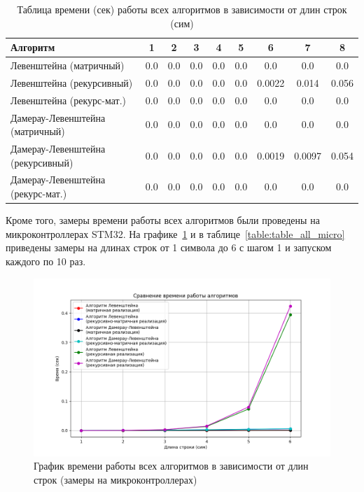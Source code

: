 \begin{table}[H]
    \centering
    \begin{tabular}{|l|c|c|c|c|c|c|c|c|}
        \hline
        \textbf{Алгоритм} & \textbf{1} & \textbf{2} & \textbf{3} & \textbf{4} & \textbf{5} & \textbf{6} & \textbf{7} & \textbf{8}\\
        \hline
        Левенштейна (матричный) & 0.0 & 0.0 & 0.0 & 0.0 & 0.0 & 0.0 & 0.0& 0.0 \\
        Левенштейна (рекурсивный) & 0.0 & 0.0 & 0.0 & 0.0 & 0.0 & 0.0022 & 0.014 & 0.056 \\
        Левенштейна (рекурс-мат.) & 0.0 & 0.0 & 0.0 & 0.0 & 0.0 & 0.0 & 0.0 & 0.0 \\
        Дамерау-Левенштейна (матричный) & 0.0 & 0.0 & 0.0 & 0.0 & 0.0 & 0.0 & 0.0 & 0.0 \\
        Дамерау-Левенштейна (рекурсивный) & 0.0 & 0.0 & 0.0 & 0.0 & 0.0 & 0.0019 & 0.0097 & 0.054 \\
        Дамерау-Левенштейна (рекурс-мат.) & 0.0 & 0.0 & 0.0 & 0.0 & 0.0 & 0.0 & 0.0 & 0.0 \\
        \hline
    \end{tabular}
    \caption{Таблица времени (сек) работы всех алгоритмов в зависимости от длин строк (сим)}
    \label{table:table_all}
\end{table}

Кроме того, замеры времени работы всех алгоритмов были проведены на микроконтроллерах STM32. На графике~\ref{fig:graph_all_micro} и в таблице~\ref{table:table_all_micro} приведены замеры на длинах строк от 1 символа до 6 с шагом 1 и запуском каждого по 10 раз.

\begin{figure}[H]
    \centering
    \includegraphics[width=1\textwidth]{img/graph_all_micro.png}
    \caption{График времени работы всех алгоритмов в зависимости от длин строк (замеры на микроконтроллерах)}
    \label{fig:graph_all_micro} %
\end{figure}

